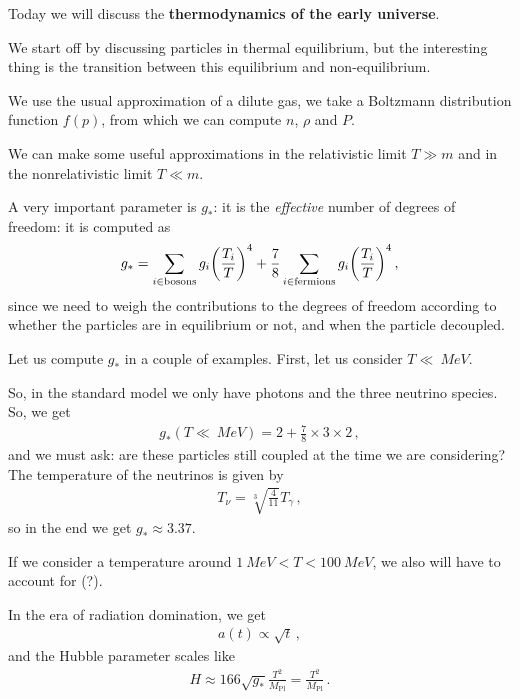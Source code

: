 \documentclass[main.tex]{subfiles}
\begin{document}

Today we will discuss the \textbf{thermodynamics of the early universe}. 

We start off by discussing particles in thermal equilibrium, but the interesting thing is the transition between this equilibrium and non-equilibrium.

We use the usual approximation of a dilute gas, we take a Boltzmann distribution function \(f(p)\), from which we can compute \(n\), \(\rho \) and \(P\).

We can make some useful approximations in the relativistic limit \(T \gg m\) and in the nonrelativistic limit \(T \ll m\).


A very important parameter is \(g_{*}\): it is the \emph{effective} number of degrees of freedom: it is computed as 
%
\begin{align}
g_{*} = \sum _{i \in \text{bosons}} g_{i} \qty(\frac{T_{i}}{T})^{4} + \frac{7}{8} \sum _{i \in \text{fermions}} g_{i} \qty( \frac{T_i}{T})^{4}
\,,
\end{align}
%
since we need to weigh the contributions to the degrees of freedom according to whether the particles are in equilibrium or not, and when the particle decoupled. 

Let us compute \(g_{*}\) in a couple of examples. First, let us consider \(T \ll \SI{}{MeV}\). 

So, in the standard model we only have photons and the three neutrino species. So, we get 
%
\begin{align}
g_{*} (T\ll\SI{}{MeV}) = 2 + \frac{7}{8} \times 3 \times 2
\,,
\end{align}
%
and we must ask: are these particles still coupled at the time we are considering?
The temperature of the neutrinos is given by 
%
\begin{align}
T_{\nu } = \sqrt[3]{ \frac{4}{11}} T_{\gamma }
\,,
\end{align}
%
so in the end we get \(g_{*} \approx 3.37\).

If we consider a temperature around \(\SI{1}{MeV} < T < \SI{100}{MeV}\), we also will have to account for (?).

In the era of radiation domination, we get 
%
\begin{align}
a(t) \propto \sqrt{t}
\,,
\end{align}
%
and the Hubble parameter scales like 
%
\begin{align}
H \approx 166 \sqrt{g_{*}} \frac{T^2}{M_{\text{Pl}}} = \frac{T^2}{M _{\text{Pl}}}
\,.
\end{align}
\end{document}
